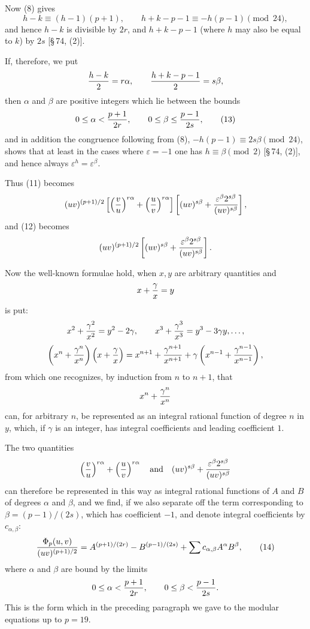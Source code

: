 \documentclass[11pt]{article}
\begin{document}
Now (8) gives
\[
 h-k\equiv(h-1)(p+1),
 \qquad
 h+k-p-1\equiv -h(p-1)
 \pmod{24},
\]
and hence $h-k$ is divisible by $2r$, and $h+k-p-1$ (where $h$ may also be equal to $k$) by $2s$ [\S\,74, (2)].

If, therefore, we put
\[
 {h-k\over2}=r\alpha,
 \qquad
 {h+k-p-1\over2}=s\beta,
\]
then $\alpha$ and $\beta$ are positive integers which lie between the bounds
\begin{equation}
 0\le\alpha<{p+1\over2r},
 \qquad
 0\le\beta\le {p-1\over2s},
\tag{13}
\end{equation}
and in addition the congruence following from (8), $-h(p-1)\equiv 2s\beta\pmod{24}$, shows that at least in the cases where $\varepsilon=-1$ one has $h\equiv\beta\pmod2$ [\S\,74, (2)], and hence always $\varepsilon^h=\varepsilon^\beta$.

Thus (11) becomes
\[
 (uv)^{(p+1)/2}
 \left[\left({v\over u}\right)^{r\alpha}+\left({u\over v}\right)^{r\alpha}\right]
 \left[(uv)^{s\beta}+{\varepsilon^\beta2^{s\beta}\over(uv)^{s\beta}}\right],
\]
and (12) becomes
\[
 (uv)^{(p+1)/2}
 \left[(uv)^{s\beta}+{\varepsilon^\beta2^{s\beta}\over(uv)^{s\beta}}\right].
\]

Now the well-known formulae hold, when $x,y$ are arbitrary quantities and
\[
 x+{\gamma\over x}=y
\]
is put:
\[
 x^2+{\gamma^2\over x^2}=y^2-2\gamma,
 \qquad
 x^3+{\gamma^3\over x^3}=y^3-3\gamma y,
 \ldots,
\]
\[
 \left(x^n+{\gamma^n\over x^n}\right)
 \left(x+{\gamma\over x}\right)
 =x^{n+1}+{\gamma^{n+1}\over x^{n+1}}
 +\gamma\left(x^{n-1}+{\gamma^{n-1}\over x^{n-1}}\right),
\]
from which one recognizes, by induction from $n$ to $n+1$, that
\[
 x^n+{\gamma^n\over x^n}
\]
can, for arbitrary $n$, be represented as an integral rational function of degree $n$ in $y$, which, if $\gamma$ is an integer, has integral coefficients and leading coefficient $1$.

The two quantities
\[
 \left({v\over u}\right)^{r\alpha}+\left({u\over v}\right)^{r\alpha}
 \quad\hbox{and}\quad
 (uv)^{s\beta}+{\varepsilon^\beta2^{s\beta}\over(uv)^{s\beta}}
\]
can therefore be represented in this way as integral rational functions of $A$ and $B$ of degrees $\alpha$ and $\beta$, and we find, if we also separate off the term corresponding to $\beta=(p-1)/(2s)$, which has coefficient $-1$, and denote integral coefficients by $c_{\alpha,\beta}$:
\begin{equation}
 {\Phi_p(u,v)\over(uv)^{(p+1)/2}}
 =A^{(p+1)/(2r)}-B^{(p-1)/(2s)}
 +\sum c_{\alpha,\beta}A^\alpha B^\beta,
\tag{14}
\end{equation}
where $\alpha$ and $\beta$ are bound by the limits
\[
 0\le\alpha<{p+1\over 2r},
 \qquad
 0\le\beta<{p-1\over 2s}.
\]
This is the form which in the preceding paragraph we gave to the modular equations up to $p=19$.
\end{document}
